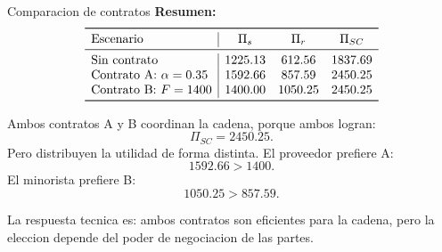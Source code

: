 \begin{solucion}{Comparacion de contratos}
\textbf{Resumen:}
\[
\begin{array}{l|ccc}
\toprule
\text{Escenario} & \Pi_s & \Pi_r & \Pi_{SC} \\
\midrule
\text{Sin contrato} & 1225.13 & 612.56 & 1837.69 \\
\text{Contrato A: } \alpha=0.35 & 1592.66 & 857.59 & 2450.25 \\
\text{Contrato B: } F=1400 & 1400.00 & 1050.25 & 2450.25 \\
\bottomrule
\end{array}
\]

Ambos contratos A y B coordinan la cadena, porque ambos logran:
\[
\Pi_{SC}=2450.25.
\]
Pero distribuyen la utilidad de forma distinta. El proveedor prefiere A:
\[
1592.66>1400.
\]
El minorista prefiere B:
\[
1050.25>857.59.
\]

La respuesta tecnica es: ambos contratos son eficientes para la cadena, pero la eleccion depende del poder de negociacion de las partes.
\end{solucion}
